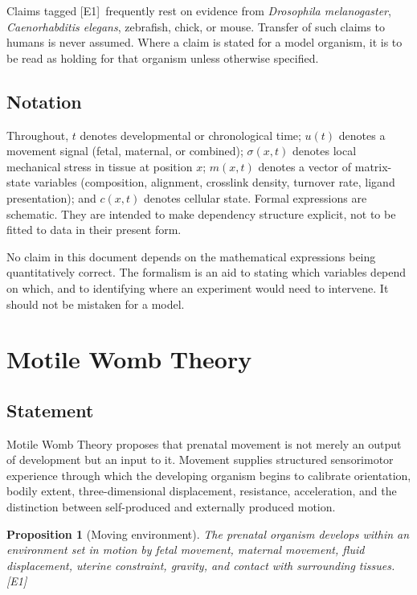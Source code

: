 \documentclass[11pt,a4paper]{article}
\theoremstyle{plain}
\newtheorem{proposition}{Proposition}[section]
\theoremstyle{definition}
\theoremstyle{remark}
\newcommand{\tier}[1]{\textup{\textsc{[#1]}}}
\newcommand{\Eone}{\tier{E1}}
\begin{document}
Claims tagged \Eone\ frequently rest on evidence from \emph{Drosophila melanogaster}, \emph{Caenorhabditis elegans}, zebrafish, chick, or mouse. Transfer of such claims to humans is never assumed. Where a claim is stated for a model organism, it is to be read as holding for that organism unless otherwise specified.

\subsection{Notation}

Throughout, $t$ denotes developmental or chronological time; $u(t)$ denotes a movement signal (fetal, maternal, or combined); $\sigma(x,t)$ denotes local mechanical stress in tissue at position $x$; $m(x,t)$ denotes a vector of matrix-state variables (composition, alignment, crosslink density, turnover rate, ligand presentation); and $c(x,t)$ denotes cellular state. Formal expressions are schematic. They are intended to make dependency structure explicit, not to be fitted to data in their present form.

\begin{caution}
No claim in this document depends on the mathematical expressions being quantitatively correct. The formalism is an aid to stating which variables depend on which, and to identifying where an experiment would need to intervene. It should not be mistaken for a model.
\end{caution}

\section{Motile Womb Theory}\label{sec:mwt}

\subsection{Statement}

Motile Womb Theory proposes that prenatal movement is not merely an output of development but an input to it. Movement supplies structured sensorimotor experience through which the developing organism begins to calibrate orientation, bodily extent, three-dimensional displacement, resistance, acceleration, and the distinction between self-produced and externally produced motion.

\begin{proposition}[Moving environment]\label{prop:moving}
The prenatal organism develops within an environment set in motion by fetal movement, maternal movement, fluid displacement, uterine constraint, gravity, and contact with surrounding tissues. \Eone
\end{proposition}
\end{document}
